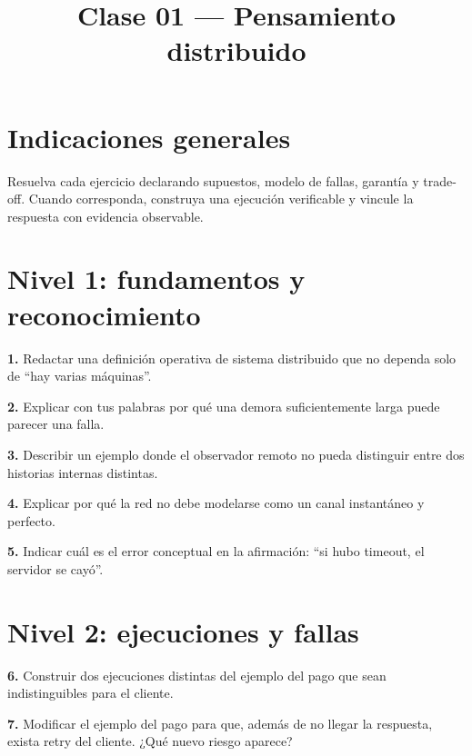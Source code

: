 \documentclass[variant=guia,cover=institutional,mode=screen]{ua-engineering-v6-article}
\title{Clase 01 --- Pensamiento distribuido}
\author{\UAProfessor}
\date{\UADate}
\begin{document}
\section{Indicaciones generales}
Resuelva cada ejercicio declarando supuestos, modelo de fallas, garantía y trade-off. Cuando corresponda, construya una ejecución verificable y vincule la respuesta con evidencia observable.

\section{Nivel 1: fundamentos y reconocimiento}
\begin{uaexercise}
\textbf{1.}
Redactar una definición operativa de sistema distribuido que no dependa solo de “hay varias máquinas”.
\end{uaexercise}

\begin{uaexercise}
\textbf{2.}
Explicar con tus palabras por qué una demora suficientemente larga puede parecer una falla.
\end{uaexercise}

\begin{uaexercise}
\textbf{3.}
Describir un ejemplo donde el observador remoto no pueda distinguir entre dos historias internas distintas.
\end{uaexercise}

\begin{uaexercise}
\textbf{4.}
Explicar por qué la red no debe modelarse como un canal instantáneo y perfecto.
\end{uaexercise}

\begin{uaexercise}
\textbf{5.}
Indicar cuál es el error conceptual en la afirmación: “si hubo timeout, el servidor se cayó”.
\end{uaexercise}


\section{Nivel 2: ejecuciones y fallas}
\begin{uaexercise}
\textbf{6.}
Construir dos ejecuciones distintas del ejemplo del pago que sean indistinguibles para el cliente.
\end{uaexercise}

\begin{uaexercise}
\textbf{7.}
Modificar el ejemplo del pago para que, además de no llegar la respuesta, exista retry del cliente.
¿Qué nuevo riesgo aparece?
\end{uaexercise}
\end{document}

